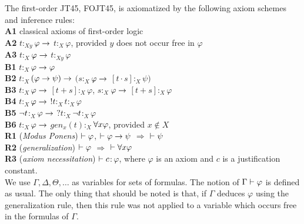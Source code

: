 \qquad  The first-order JT45, FOJT45, is axiomatized by the following axiom schemes and inference rules:\\

\textbf{A1} classical axioms of first-order logic\\

\textbf{A2} $t$$:_{Xy}$$\varphi \rightarrow$ $t$$:_{X}$$\varphi$, provided $y$ does not occur free in $\varphi$\\

\textbf{A3} $t$$:_{X}$$\varphi \rightarrow$ $t$$:_{Xy}$$\varphi$ \\

\textbf{B1} $t$$:_{X}$$\varphi \rightarrow \varphi$\\

\textbf{B2} $t$$:_{X}$$(\varphi \rightarrow \psi) \rightarrow$ $(s$$:_{X}$$\varphi \rightarrow$ $[t\cdot s]$$:_{X}$$\psi)$\\

\textbf{B3} $t$$:_{X}$$\varphi \rightarrow$ $[t+s]$$:_{X}$$\varphi$, $s$$:_{X}$$\varphi \rightarrow$ $[t+s]$$:_{X}$$\varphi$\\ 

\textbf{B4} $t$$:_{X}$$\varphi \rightarrow$ $!t$$:_{X}$$t$$:_{X}$$\varphi$\\


\textbf{B5} $\neg t$$:_{X}$$\varphi \rightarrow$ $?t$$:_{X}$$\neg t$$:_{X}$$\varphi$\\


\textbf{B6} $t$$:_{X}$$\varphi \rightarrow$ $gen_{x}(t)$$:_{X}$$ \forall x \varphi$, provided $x \notin X$\\


\textbf{R1} (\textit{Modus Ponens}) $\vdash \varphi$, $\vdash \varphi\rightarrow\psi$ $\Rightarrow$ $\vdash \psi$ \\

\textbf{R2} (\textit{generalization})  $\vdash \varphi$ $\Rightarrow$ $\vdash \forall x \varphi$ \\

\textbf{R3} (\textit{axiom necessitation})  $\vdash c$$:$$\varphi$, where $\varphi$ is an axiom and $c$ is a justification constant.\\

\qquad We use $\Gamma, \Delta, \Theta, \dots$ as variables for sets of formulas. The notion of $\Gamma \vdash \varphi$ is defined as usual. The only thing that should be noted is that, if $\Gamma$ deduces $\varphi$ using the generalization rule, then this rule was not applied to a variable which occurs free in the formulas of $\Gamma$. 

